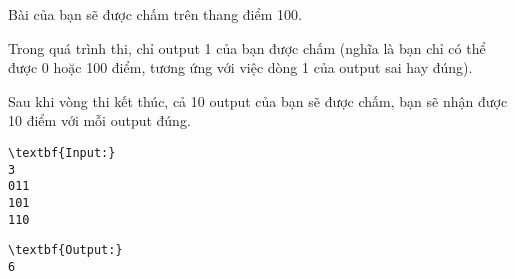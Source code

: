 Bài của bạn sẽ được chấm trên thang điểm 100.

Trong quá trình thi, chỉ output 1 của bạn được chấm (nghĩa là bạn chỉ có thể được 0 hoặc 100 điểm, tương ứng với việc dòng 1 của output sai hay đúng).

Sau khi vòng thi kết thúc, cả 10 output của bạn sẽ được chấm, bạn sẽ nhận được 10 điểm với mỗi output đúng.
\begin{verbatim}
\textbf{Input:}
3
011
101
110\end{verbatim}
\begin{verbatim}
\textbf{Output:}
6
\end{verbatim}